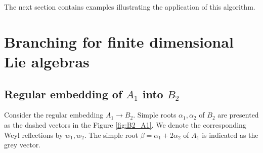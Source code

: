 \documentclass[12pt]{iopart}
\theoremstyle{definition}
\begin{document}
The next section contains examples illustrating the application of this
algorithm.

\section{Branching for finite dimensional Lie algebras}
\label{sec:finite-dimens-lie}

\subsection{Regular embedding of $A_1$ into $B_2$}
\label{sec:regul-embedd-a_1}

Consider the regular embedding $A_1\to B_2$. Simple roots $\alpha_1, \alpha_2$ of $B_2$ are presented as the dashed vectors in the Figure \ref{fig:B2_A1}. We denote the corresponding Weyl reflections by $w_1, w_2$. The simple root $\beta = \alpha_1+2\alpha_2$ of $A_1$ is indicated as the grey vector.
\end{document}
